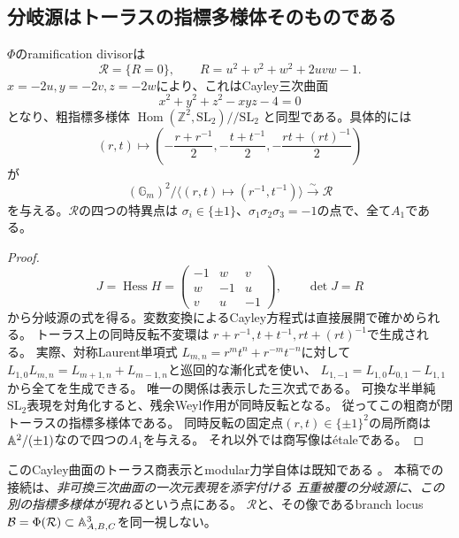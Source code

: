 \subsection{分岐源はトーラスの指標多様体そのものである}
\begin{theorem}[Cayley曲面とトーラス商]
\label{thm:ramification-cayley-torus}
$\Phi$のramification divisorは
\begin{equation}\label{eq:cayley-ramification}
 \mathcal R=\{R=0\},\qquad
 R=u^2+v^2+w^2+2uvw-1.
\end{equation}
$x=-2u,y=-2v,z=-2w$により、これはCayley三次曲面
\[
 x^2+y^2+z^2-xyz-4=0
\]
となり、粗指標多様体
$\operatorname{Hom}(\mathbb Z^2,\mathrm{SL}_2)\mathbin{/\!/}\mathrm{SL}_2$
と同型である。具体的には
\begin{equation}\label{eq:cayley-torus-cover}
 (r,t)\longmapsto
 \left(-\frac{r+r^{-1}}2,-\frac{t+t^{-1}}2,
 -\frac{rt+(rt)^{-1}}2\right)
\end{equation}
が
\[
 (\mathbb G_m)^2/\langle(r,t)\mapsto(r^{-1},t^{-1})\rangle
 \xrightarrow{\sim}\mathcal R
\]
を与える。$\mathcal R$の四つの特異点は
$\sigma_i\in\{\pm1\}$、$\sigma_1\sigma_2\sigma_3=-1$の点で、全て$A_1$である。
\end{theorem}
\begin{proof}
\[
 J=\operatorname{Hess}H=
 \begin{pmatrix}-1&w&v\\w&-1&u\\v&u&-1\end{pmatrix},\qquad \det J=R
\]
から分岐源の式を得る。変数変換によるCayley方程式は直接展開で確かめられる。
トーラス上の同時反転不変環は
$r+r^{-1},t+t^{-1},rt+(rt)^{-1}$で生成される。
実際、対称Laurent単項式
$L_{m,n}=r^mt^n+r^{-m}t^{-n}$に対して
$L_{1,0}L_{m,n}=L_{m+1,n}+L_{m-1,n}$と巡回的な漸化式を使い、
$L_{1,-1}=L_{1,0}L_{0,1}-L_{1,1}$から全てを生成できる。
唯一の関係は表示した三次式である。
可換な半単純$\mathrm{SL}_2$表現を対角化すると、残余Weyl作用が同時反転となる。
従ってこの粗商が閉トーラスの指標多様体である。
同時反転の固定点$(r,t)\in\{\pm1\}^2$の局所商は
$\AA^2/(\pm1)$なので四つの$A_1$を与える。
それ以外では商写像は\'{e}taleである。
\end{proof}

このCayley曲面のトーラス商表示とmodular力学自体は既知である
\cite[\S1.5]{CantatLorayCayley}。
本稿での接続は、\emph{非可換三次曲面の一次元表現を添字付ける
五重被覆の分岐源に、この別の指標多様体が現れる}という点にある。
$\mathcal R$と、その像であるbranch locus
$\mathcal B=\Phi(\mathcal R)\subset\AA^3_{A,B,C}$を同一視しない。

